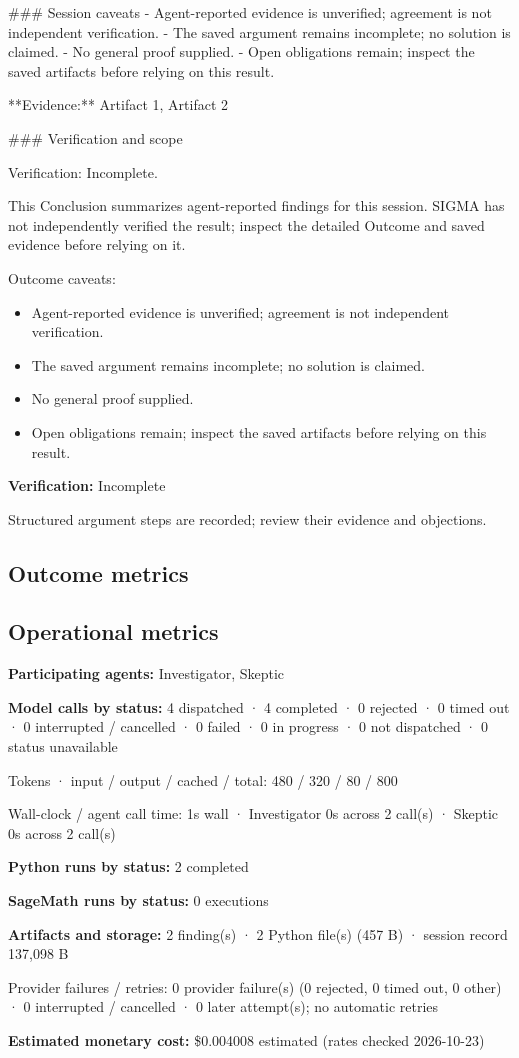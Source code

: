 \documentclass[11pt]{article}
\begin{document}
\#\#\# Session caveats
- Agent-reported evidence is unverified; agreement is not independent verification.
- The saved argument remains incomplete; no solution is claimed.
- No general proof supplied.
- Open obligations remain; inspect the saved artifacts before relying on this result.

**Evidence:** Artifact 1, Artifact 2

\#\#\# Verification and scope

Verification: Incomplete.

This Conclusion summarizes agent-reported findings for this session. SIGMA has not independently verified the result; inspect the detailed Outcome and saved evidence before relying on it.\par
Outcome caveats:\par
\begin{itemize}
\item Agent-reported evidence is unverified; agreement is not independent verification.
\item The saved argument remains incomplete; no solution is claimed.
\item No general proof supplied.
\item Open obligations remain; inspect the saved artifacts before relying on this result.
\end{itemize}
\textbf{Verification:} Incomplete\par
Structured argument steps are recorded; review their evidence and objections.\par
\subsection{Outcome metrics}
\subsection{Operational metrics}
\textbf{Participating agents:} Investigator, Skeptic\par
\textbf{Model calls by status:} 4 dispatched · 4 completed · 0 rejected · 0 timed out · 0 interrupted / cancelled · 0 failed · 0 in progress · 0 not dispatched · 0 status unavailable\par
Tokens · input / output / cached / total: 480 / 320 / 80 / 800\par
Wall-clock / agent call time: 1s wall · Investigator 0s across 2 call(s) · Skeptic 0s across 2 call(s)\par
\textbf{Python runs by status:} 2 completed\par
\textbf{SageMath runs by status:} 0 executions\par
\textbf{Artifacts and storage:} 2 finding(s) · 2 Python file(s) (457 B) · session record 137,098 B\par
Provider failures / retries: 0 provider failure(s) (0 rejected, 0 timed out, 0 other) · 0 interrupted / cancelled · 0 later attempt(s); no automatic retries\par
\textbf{Estimated monetary cost:} \$0.004008 estimated (rates checked 2026-10-23)\par
\end{document}
